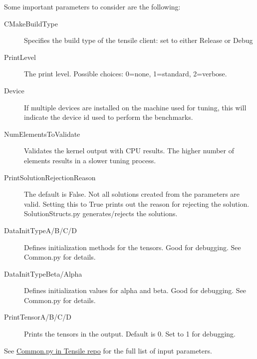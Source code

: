 \documentclass[]{article}
\begin{document}
\noindent
Some important parameters to consider are the following:
\begin{description}
\item[CMakeBuildType] Specifies the build type of the tensile client: set to either Release or Debug
\item[PrintLevel] The print level. Possible choices: 0=none, 1=standard, 2=verbose.
\item[Device] If multiple devices are installed on the machine used for tuning, this will indicate the device id used to perform the benchmarks.
\item[NumElementsToValidate] Validates the kernel output with CPU results. The higher number of elements results in a slower tuning process.
\item[PrintSolutionRejectionReason] The default is False. Not all solutions created from the parameters are valid. Setting this to True prints out the reason for rejecting the solution. SolutionStructs.py generates/rejects the solutions.
\item[DataInitTypeA/B/C/D] Defines initialization methods for the tensors. Good for debugging. See Common.py for details.
\item[DataInitTypeBeta/Alpha] Defines initialization values for alpha and beta. Good for debugging. See Common.py for details.
\item[PrintTensorA/B/C/D] Prints the tensors in the output. Default is 0. Set to 1 for debugging.
\end{description}

\noindent
See \href{https://github.com/ROCm/Tensile/blob/master/Tensile/Common.py}{Common.py in Tensile repo} for the full list of input parameters.
\end{document}
